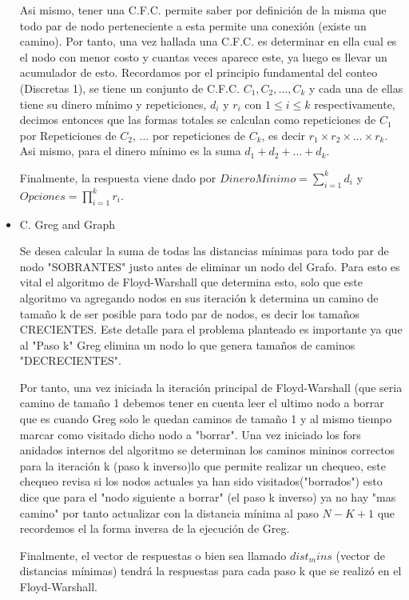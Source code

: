 \documentclass[a4paper,12pt]{article}
\begin{document}
\begin{itemize}
Asi mismo, tener una C.F.C. permite saber por definición de la misma que todo par de nodo perteneciente a esta permite una conexión (existe un camino). Por tanto, una vez hallada una C.F.C. es determinar en ella cual es el nodo con menor costo y cuantas veces aparece este, ya luego es llevar un acumulador de esto. Recordamos por el principio fundamental del conteo (Discretas 1), se tiene un conjunto de C.F.C. $C_1, C_2, ..., C_k$ y cada una de ellas tiene su dinero mínimo y repeticiones, $d_i$ y $r_i$ con $1 \leq i \leq k$ respectivamente, decimos entonces que las formas totales se calculan como repeticiones de $C_1$ por Repeticiones de $C_2$, ... por repeticiones de $C_k$, es decir $r_1 \times r_2 \times ... \times r_k$. Asi mismo, para el dinero mínimo es la suma $d_1 + d_2 + ... + d_k$. 

Finalmente, la respuesta viene dado por $Dinero Minimo = \displaystyle\sum_{i=1}^{k} d_i$ y $Opciones = \displaystyle\prod_{i=1}^{k} r_i$.

\item C. Greg and Graph

Se desea calcular la suma de todas las distancias mínimas para todo par de nodo "SOBRANTES" justo antes de eliminar un nodo del Grafo. Para esto es vital el algoritmo de Floyd-Warshall que determina esto, solo que este algoritmo va agregando nodos en sus iteración k determina un camino de tamaño k de ser posible para todo par de nodos, es decir los tamaños CRECIENTES. Este detalle para el problema planteado es importante ya que al "Paso k" Greg elimina un nodo lo que genera tamaños de caminos "DECRECIENTES". 

Por tanto, una vez iniciada la iteración principal de Floyd-Warshall (que seria camino de tamaño 1 debemos tener en cuenta leer el ultimo nodo a borrar que es cuando Greg solo le quedan caminos de tamaño 1 y al mismo tiempo marcar como visitado dicho nodo a "borrar". Una vez iniciado los fors anidados internos del algoritmo se determinan los caminos mininos correctos para la iteración k (paso k inverso)lo que permite realizar un chequeo, este chequeo revisa si los nodos actuales ya han sido visitados("borrados") esto dice que para el "nodo siguiente a borrar" (el paso k inverso) ya no hay "mas camino" por tanto actualizar con la distancia mínima al paso $N-K+1$ que recordemos el la forma inversa de la ejecución de Greg.

Finalmente, el vector de respuestas o bien sea llamado $dist_mins$ (vector de distancias mínimas) tendrá la respuestas para cada paso k que se realizó en el Floyd-Warshall.

\end{itemize}
\end{document}
